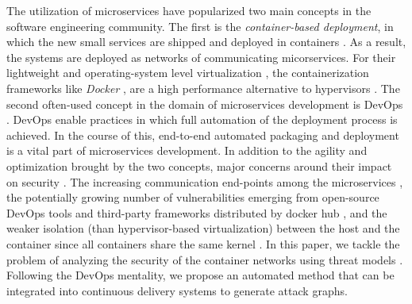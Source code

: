 The utilization of microservices have popularized two main concepts in the software engineering community. The first is the \textit{container-based deployment}, in which the new small services are shipped and deployed in containers \cite{jaramillo2016leveraging}. As a result, the systems are deployed as networks of communicating micorservices. For their lightweight and operating-system level virtualization \cite{bottomely}, the containerization frameworks like \textit{Docker} \cite{cerny2018contextual}, are a high performance alternative to hypervisors \cite{kratzke2017microservices}. The second often-used concept in the domain of microservices development is DevOps \cite{cerny2018contextual}. DevOps enable practices in which full automation of the deployment process is achieved. In the course of this, end-to-end automated packaging and deployment  is a vital part of microservices development. In addition to the agility and optimization brought by the two concepts, major concerns around their impact on security \cite{ahmadvand2016requirements}. The increasing communication end-points among the microservices \cite{ahmadvand2016requirements}, the potentially growing number of vulnerabilities emerging from open-source DevOps tools and third-party frameworks distributed by docker hub \cite{shu2017study,gummaraju2015over}, and the weaker isolation (than hypervisor-based virtualization) between the host and the container since all containers share the same kernel \cite{Bottomley,bui2015analysis}. In this paper, we tackle the problem of analyzing the security of the container networks using threat models \cite{kordy2014dag}. Following the DevOps mentality, we propose an automated method that can be integrated into continuous delivery systems to generate attack graphs.



